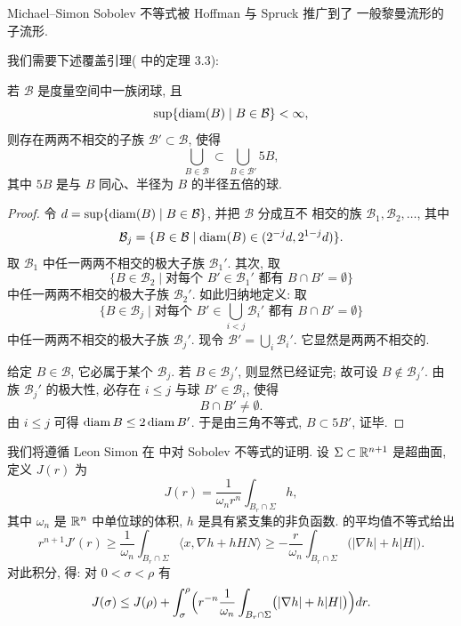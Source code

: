 Michael--Simon Sobolev 不等式被 Hoffman 与 Spruck \cite{HoSp} 推广到了
一般黎曼流形的子流形.

我们需要下述覆盖引理(\cite{Si3} 中的定理 3.3):

\begin{lemma}
\label{lem:3.13}
若 $\mathcal{B}$ 是度量空间中一族闭球, 且
\[
\sup\{\operatorname{diam}(B)\mid B\in\mathcal{B}\}<\infty,
\]
则存在两两不相交的子族 $\mathcal{B}'\subset\mathcal{B}$, 使得
\[
\bigcup_{B\in\mathcal{B}}\subset\bigcup_{B\in\mathcal{B}'}5B,
\]
其中 $5B$ 是与 $B$ 同心、半径为 $B$ 的半径五倍的球.
\end{lemma}

\begin{proof}
令 $d=\sup\{\operatorname{diam}(B)\mid B\in\mathcal{B}\}$, 并把 $\mathcal{B}$ 分成互不
相交的族 $\mathcal{B}_1,\mathcal{B}_2,\dots$, 其中
\[
\mathcal{B}_j=\{B\in\mathcal{B}\mid
 \operatorname{diam}(B)\in(2^{-j}d,2^{1-j}d)\}.
\]
取 $\mathcal{B}_1$ 中任一两两不相交的极大子族 $\mathcal{B}_1'$. 其次, 取
\[
\{B\in\mathcal{B}_2\mid \text{对每个 }B'\in\mathcal{B}_1'
 \text{ 都有 }B\cap B'=\emptyset\}
\]
中任一两两不相交的极大子族 $\mathcal{B}_2'$. 如此归纳地定义: 取
\[
\{B\in\mathcal{B}_j\mid \text{对每个 }
B'\in\bigcup_{i<j}\mathcal{B}_i'\text{ 都有 }B\cap B'=\emptyset\}
\]
中任一两两不相交的极大子族 $\mathcal{B}_j'$. 现令
$\mathcal{B}'=\bigcup_i\mathcal{B}_i'$. 它显然是两两不相交的.

给定 $B\in\mathcal{B}$, 它必属于某个 $\mathcal{B}_j$. 若
$B\in\mathcal{B}_j'$, 则显然已经证完; 故可设 $B\notin\mathcal{B}_j'$. 由
族 $\mathcal{B}_j'$ 的极大性, 必存在 $i\leq j$ 与球
$B'\in\mathcal{B}_i$, 使得
\[
B\cap B'\neq\emptyset.
\]
由 $i\leq j$ 可得 $\operatorname{diam} B\leq2\operatorname{diam} B'$. 于是由三角不等式,
$B\subset5B'$, 证毕.
\end{proof}

我们将遵循 Leon Simon 在 \cite{Si3} 中对 Sobolev 不等式的证明. 设
$\Sigma\subset\mathbb{R}^{n+1}$ 是超曲面, 定义 $J(r)$ 为
\begin{equation}
J(r)=\frac{1}{\omega_nr^n}\int_{B_r\cap\Sigma}h,
\label{eq:3.41}
\end{equation}
其中 $\omega_n$ 是 $\mathbb{R}^n$ 中单位球的体积, $h$ 是具有紧支集的非负函数.
 的平均值不等式给出
\begin{equation}
r^{n+1}J'(r)\geq\frac{1}{\omega_n}\int_{B_r\cap\Sigma}
 \langle x,\nabla h+hHN\rangle
 \geq-\frac{r}{\omega_n}\int_{B_r\cap\Sigma}
 \bigl(|\nabla h|+h|H|\bigr).
\label{eq:3.42}
\end{equation}
对此积分, 得: 对 $0<\sigma<\rho$ 有
\begin{equation}
J(\sigma)\leq J(\rho)+\int_\sigma^\rho
 \Bigl(r^{-n}\frac{1}{\omega_n}\int_{B_r\cap\Sigma}
 \bigl(|\nabla h|+h|H|\bigr)\Bigr)dr.
\label{eq:3.43}
\end{equation}

